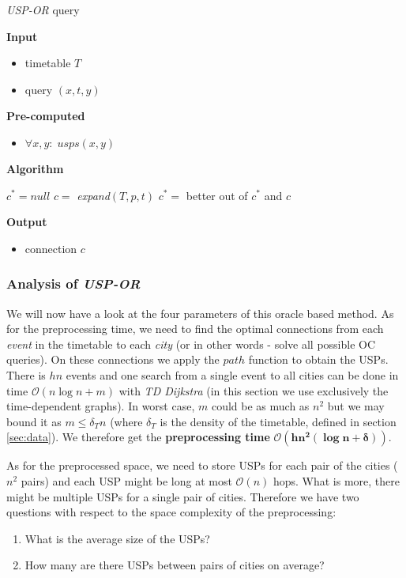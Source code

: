 	\color{algcolor}
	\begin{algorithm}[H]
		\color{inalgcolor}
		\caption{\textit{USP-OR} query}
		\label{alg:uspor-query}
		\textbf{Input} 
		\begin{itemize}
			\item timetable $T$
			\item query $(x, t, y)$
		\end{itemize}
		\textbf{Pre-computed} 
		\begin{itemize}
			\item $\forall x, y: \; usps(x, y)$
		\end{itemize}
		\textbf{Algorithm}
		\begin{algorithmic}[1]
			\STATE $c^{*} = null$
				\STATE $c =$ \textit{expand}$(T, p, t)$
				\STATE $c^{*} =$ better out of $c^{*}$ and $c$
			\ENDFOR
		\end{algorithmic}
		\textbf{Output}
		\begin{itemize}
			\item connection $c$
		\end{itemize}
	\end{algorithm}
	\color{black}	
	
	\subsubsection{Analysis of \textit{USP-OR}}	
	
		\noindent We will now have a look at the four parameters of this oracle based method. As for the preprocessing time, we need to find the optimal connections from each \textit{event} in the timetable to each \textit{city} (or in other words - solve all possible OC queries). On these connections we apply the $path$ function to obtain the USPs. There is $hn$ events and one search from a single event to all cities can be done in time $\mathcal{O}(n \log n + m)$ with \textit{TD Dijkstra} (in this section we use exclusively the time-dependent graphs). In worst case, $m$ could be as much as $n^{2}$ but we may bound it as $m \leq \delta_{T} n$ (where $\delta_{T}$ is the density of the timetable, defined in section \ref{sec:data}). We therefore get the \textbf{preprocessing time} $\bm{\mathcal{O}(hn^{2} (\log n + \delta))}$. 
		
		As for the preprocessed space, we need to store USPs for each pair of the cities ($n^{2}$ pairs) and each USP might be long at most $\mathcal{O}(n)$ hops. What is more, there might be multiple USPs for a single pair of cities. Therefore we have two questions with respect to the space complexity of the preprocessing:
		\begin{enumerate}
			\item What is the average size of the USPs?
			\item How many are there USPs between pairs of cities on average?
		\end{enumerate}
		\hspace*{\fill}
		

